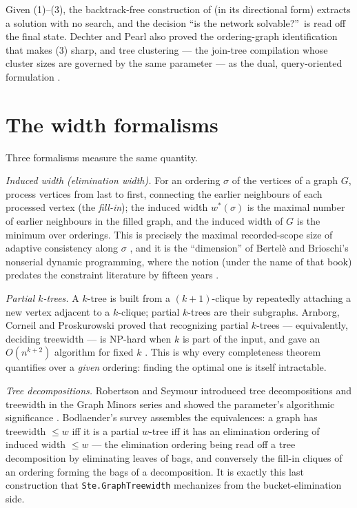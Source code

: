 \documentclass[11pt]{article}
\newcommand{\ste}[1]{\texttt{#1}}
\begin{document}
Given (1)--(3), the backtrack-free construction of
\citet{freuder1982backtrack} (in its directional form) extracts a
solution with no search, and the decision ``is the network
solvable?''\ is read off the final state. Dechter and Pearl also
proved the ordering-graph identification that makes (3) sharp, and
tree clustering --- the join-tree compilation whose cluster sizes are
governed by the same parameter --- as the dual, query-oriented
formulation \citep{dechterpearl1989tree}.

\section{The width formalisms}
\label{sec:width}

Three formalisms measure the same quantity.

\emph{Induced width (elimination width).} For an ordering $\sigma$ of
the vertices of a graph $G$, process vertices from last to first,
connecting the earlier neighbours of each processed vertex (the
\emph{fill-in}); the induced width $w^*(\sigma)$ is the maximal number
of earlier neighbours in the filled graph, and the induced width of
$G$ is the minimum over orderings. This is precisely the maximal
recorded-scope size of adaptive consistency along $\sigma$
\citep{dechterpearl1987network, dechter2003constraint}, and it is the
``dimension'' of Bertel\`e and Brioschi's nonserial dynamic
programming, where the notion (under the name of that book) predates
the constraint literature by fifteen years \citep{bertele1972nonserial}.

\emph{Partial $k$-trees.} A $k$-tree is built from a $(k{+}1)$-clique
by repeatedly attaching a new vertex adjacent to a $k$-clique; partial
$k$-trees are their subgraphs. Arnborg, Corneil and Proskurowski
proved that recognizing partial $k$-trees --- equivalently, deciding
treewidth --- is NP-hard when $k$ is part of the input, and gave an
$O(n^{k+2})$ algorithm for fixed $k$ \citep{arnborg1987complexity}.
This is why every completeness theorem quantifies over a \emph{given}
ordering: finding the optimal one is itself intractable.

\emph{Tree decompositions.} Robertson and Seymour introduced
tree decompositions and treewidth in the Graph Minors series and
showed the parameter's algorithmic significance
\citep{robertson1986graphminorsII}. Bodlaender's survey
\citep{bodlaender1998arboretum} assembles the equivalences: a graph
has treewidth $\le w$ iff it is a partial $w$-tree iff it has an
elimination ordering of induced width $\le w$ --- the elimination
ordering being read off a tree decomposition by eliminating leaves of
bags, and conversely the fill-in cliques of an ordering forming the
bags of a decomposition. It is exactly this last construction that
\ste{Ste.GraphTreewidth} mechanizes from the bucket-elimination side.
\end{document}
